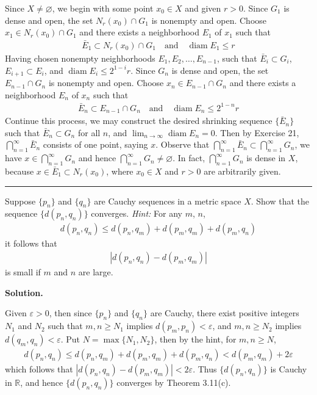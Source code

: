 \documentclass[12pt]{article}
\theoremstyle{definition}
\begin{document}
Since $X\ne\varnothing$, we begin with some point $x_0\in X$ and given $r>0$. Since $G_1$ is dense and open, the set $N_r(x_0)\cap G_1$ is nonempty and open. Choose $x_1\in N_r(x_0)\cap G_1$ and there exists a neighborhood $E_1$ of $x_1$ such that
\begin{align*}
\bar{E}_1\subset N_r(x_0)\cap G_1\quad\mbox{and}\quad
\operatorname{diam}E_1\le r
\end{align*}
Having chosen nonempty neighborhoods $E_1,E_2,\ldots,E_{n-1}$, such that $\bar{E}_i\subset G_i$, $E_{i+1}\subset E_i$, and $\operatorname{diam}E_i\le 2^{1-i}r$. Since $G_n$ is dense and open, the set $E_{n-1}\cap G_n$ is nonempty and open. Choose $x_n\in E_{n-1}\cap G_n$ and there exists a neighborhood $E_n$ of $x_n$ such that
\begin{align*}
\bar{E}_n\subset E_{n-1}\cap G_n\quad\mbox{and}\quad
\operatorname{diam}E_n\le 2^{1-n}r
\end{align*}
Continue this process, we may construct the desired shrinking sequence $\{\bar{E}_n\}$ such that $\bar{E}_n\subset G_n$ for all $n$, and $\lim_{n\to\infty}\operatorname{diam}E_n=0$. Then by Exercise 21, $\bigcap_{n=1}^\infty\bar{E}_n$ consists of one point, saying $x$. Observe that $\bigcap_{n=1}^\infty\bar{E}_n\subset\bigcap_{n=1}^\infty G_n$, we have $x\in\bigcap_{n=1}^\infty G_n$ and hence $\bigcap_{n=1}^\infty G_n\ne\varnothing$. In fact, $\bigcap_{n=1}^\infty G_n$ is dense in $X$, because $x\in\bar{E}_1\subset N_r(x_0)$, where $x_0\in X$ and $r>0$ are arbitrarily given.



\bigskip\noindent\hrule\bigskip

Suppose $\{p_n\}$ and $\{q_n\}$ are Cauchy sequences in a metric space $X$. Show that the sequence $\{d(p_n,q_n)\}$ converges. \textit{Hint:} For any $m$, $n$,
\begin{align*}
d(p_n,q_n)
\le d(p_n,q_m)+d(p_m,q_m)+d(p_m,q_n)
\end{align*}
it follows that
\begin{align*}
\left\vert d(p_n,q_n)-d(p_m,q_m)\right\vert
\end{align*}
is small if $m$ and $n$ are large.

\smallskip
\noindent\textbf{Solution.}\quad

Given $\varepsilon>0$, then since $\{p_n\}$ and $\{q_n\}$ are Cauchy, there exist positive integers $N_1$ and $N_2$ such that $m,n\ge N_1$ implies $d(p_m,p_n)<\varepsilon$, and $m,n\ge N_2$ implies $d(q_m,q_n)<\varepsilon$. Put $N=\max\{N_1,N_2\}$, then by the hint, for $m,n\ge N$,
\begin{align*}
d(p_n,q_n)
\le d(p_n,q_m)+d(p_m,q_m)+d(p_m,q_n)
<d(p_m,q_m)+2\varepsilon
\end{align*}
which follows that $\left\vert d(p_n,q_n)-d(p_m,q_m)\right\vert<2\varepsilon$. Thus $\{d(p_n,q_n)\}$ is Cauchy in $\mathbb{R}$, and hence $\{d(p_n,q_n)\}$ converges by Theorem 3.11(c).
\end{document}
